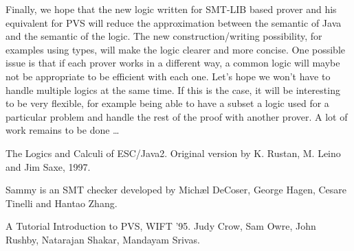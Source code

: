 \documentclass[english,a4paper,10pt]{article}
\begin{document}
Finally, we hope that the new logic written for SMT-LIB based prover
and his equivalent for PVS will reduce the approximation between the
semantic of Java and the semantic of the logic. The new
construction/writing possibility, for examples using types, will make
the logic clearer and more concise. One possible issue is that if each
prover works in a different way, a common logic will maybe not be
appropriate to be efficient with each one. Let's hope we won't have to
handle multiple logics at the same time. If this is the case, it will
be interesting to be very flexible, for example being able to have a
subset a logic used for a particular problem and handle the rest of
the proof with another prover. A lot of work remains to be done \dots

\begin{thebibliography}{2}
 The Logics and Calculi of ESC/Java2. Original version
  by K. Rustan, M. Leino and Jim Saxe, 1997.

 Sammy is an SMT checker developed by Mich\ae{}l
  DeCoser, George Hagen, Cesare Tinelli and Hantao Zhang.

 A Tutorial Introduction to PVS, WIFT '95. Judy Crow,
  Sam Owre, John Rushby, Natarajan Shakar, Mandayam Srivas.
\end{thebibliography}
\end{document}

